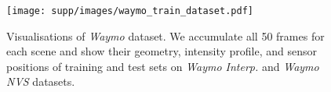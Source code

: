 \begin{figure}[t]
\centering
\texttt{[image: supp/images/waymo\_train\_dataset.pdf]}

\caption{Visualisations of \textit{Waymo} dataset. We accumulate all 50 frames for each scene and show their geometry, intensity profile, and sensor positions of training and test sets on \textit{Waymo Interp.} and \textit{Waymo NVS} datasets.}
\label{fig:supp_waymo_dataset}

\end{figure}